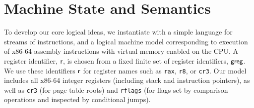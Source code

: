 \section{Machine State and Semantics}
\label{sec:syntax}
To develop our core logical ideas, we instantiate \iris with a simple language for streams of instructions, 
and a logical machine model corresponding to execution of x86-64 assembly instructions with virtual memory enabled on the 
CPU.
%
A register identifier, $\mathsf{r}$, is chosen from a fixed finite set of register identifiers, $\mathsf{greg}$. 
We use these identifiers $\mathsf{r}$ for register names such as \lstinline|rax|, \lstinline|r8|, or \lstinline|cr3|. Our model includes
all x86-64 integer registers (including stack and instruction pointers), as well as \lstinline|cr3| (for page table roots) and \lstinline|rflags| (for
flags set by comparison operations and inspected by conditional jumps).
